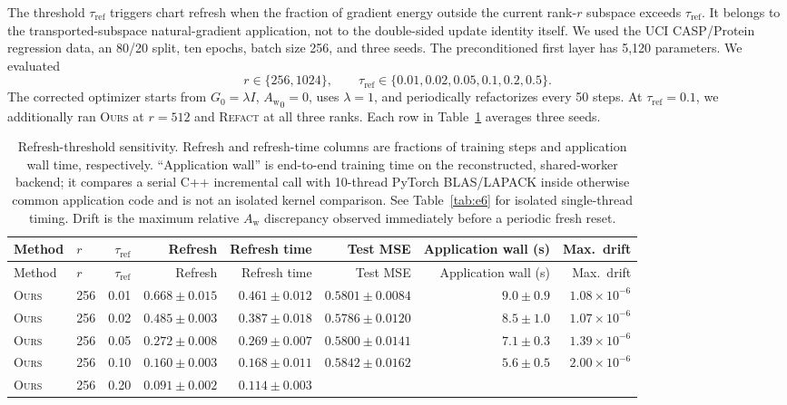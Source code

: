 \documentclass[11pt]{article}
\newcommand{\ours}{\textsc{Ours}}
\newcommand{\refact}{\textsc{Refact}}
\newcommand{\Aw}{A_{\mathrm w}}
\newcommand{\tref}{\tau_{\mathrm{ref}}}
\begin{document}
The threshold \(\tref\) triggers chart refresh when the fraction of gradient
energy outside the current rank-\(r\) subspace exceeds \(\tref\).  It belongs
to the transported-subspace natural-gradient application, not to the
double-sided update identity itself.  We used the UCI CASP/Protein regression
data, an 80/20 split, ten epochs, batch size 256, and three seeds.  The
preconditioned first layer has 5,120 parameters.  We evaluated
\[
  r\in\{256,1024\},\qquad
  \tref\in\{0.01,0.02,0.05,0.1,0.2,0.5\}.
\]
The corrected optimizer starts from \(G_0=\lambda I\), \({\Aw}_0=0\), uses
\(\lambda=1\), and periodically refactorizes every 50 steps.  At
\(\tref=0.1\), we additionally ran \ours{} at \(r=512\) and \refact{} at all
three ranks.  Each row in Table~\ref{tab:e1} averages three seeds.

\begin{landscape}
\begin{longtable}{@{}llrrrrrr@{}}
\caption{Refresh-threshold sensitivity.  Refresh and refresh-time columns are
fractions of training steps and application wall time, respectively.
``Application wall'' is end-to-end training time on the reconstructed,
shared-worker backend; it compares a serial C++ incremental call with
10-thread PyTorch BLAS/LAPACK inside otherwise common application code and is
not an isolated kernel comparison.  See Table~\ref{tab:e6} for isolated
single-thread timing.  Drift is the maximum relative \(\Aw\) discrepancy
observed immediately before a periodic fresh reset.}
\label{tab:e1}\\
\toprule
Method & \(r\) & \(\tref\) & Refresh & Refresh time & Test MSE &
Application wall (s) & Max.\ drift \\
\midrule
\endfirsthead
\toprule
Method & \(r\) & \(\tref\) & Refresh & Refresh time & Test MSE &
Application wall (s) & Max.\ drift \\
\midrule
\endhead
\ours & 256 & 0.01 & \(0.668\pm0.015\) & \(0.461\pm0.012\) &
\(0.5801\pm0.0084\) & \(9.0\pm0.9\) & \(1.08{\times}10^{-6}\) \\
\ours & 256 & 0.02 & \(0.485\pm0.003\) & \(0.387\pm0.018\) &
\(0.5786\pm0.0120\) & \(8.5\pm1.0\) & \(1.07{\times}10^{-6}\) \\
\ours & 256 & 0.05 & \(0.272\pm0.008\) & \(0.269\pm0.007\) &
\(0.5800\pm0.0141\) & \(7.1\pm0.3\) & \(1.39{\times}10^{-6}\) \\
\ours & 256 & 0.10 & \(0.160\pm0.003\) & \(0.168\pm0.011\) &
\(0.5842\pm0.0162\) & \(5.6\pm0.5\) & \(2.00{\times}10^{-6}\) \\
\ours & 256 & 0.20 & \(0.091\pm0.002\) & \(0.114\pm0.003\) &

\end{longtable}
\end{landscape}
\end{document}
